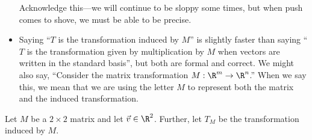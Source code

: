 \begin{annotation}
\begin{notes}
\begin{itemize}
					Acknowledge this---we will continue to be sloppy some times, but when push comes to
					shove, we must be able to be precise.
				\item Saying ``$T$ is the transformation induced by $M$'' is slightly faster
					than saying ``$T$ is the transformation given by multiplication by $M$ when
					vectors are written in the standard basis'',
					but both are formal and correct. We might also say, ``Consider the matrix transformation
					$M:\R^m\to\R^n$.'' When we say this, we mean that we are using the letter $M$ 
					to represent both the matrix and the induced transformation.
			\end{itemize}
		\end{notes}
	\end{annotation}
	\label{inducedTransform}
	Let $M$ be a $2\times 2$ matrix and let $\vec v\in\R^2$. Further, let $T_M$
	be the transformation induced by $M$.
